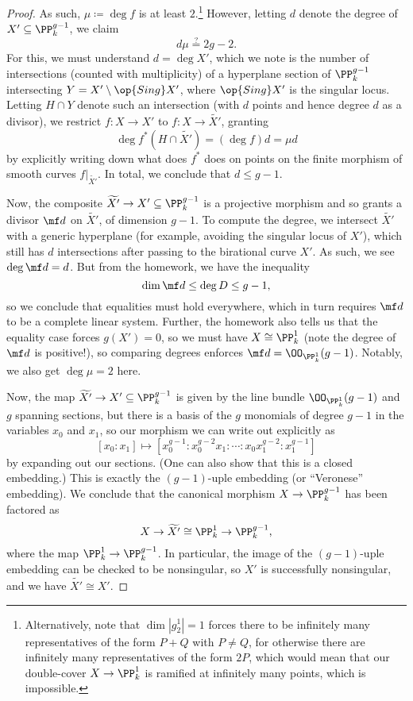 \documentclass[../notes.tex]{subfiles}
\begin{document}
\begin{proof}
	As such, $\mu\coloneqq\deg f$ is at least $2$.\footnote{Alternatively, note that $\dim|g^1_2|=1$ forces there to be infinitely many representatives of the form $P+Q$ with $P\ne Q$, for otherwise there are infinitely many representatives of the form $2P$, which would mean that our double-cover $X\to\PP^1_k$ is ramified at infinitely many points, which is impossible.} However, letting $d$ denote the degree of $X'\subseteq\PP^{g-1}_k$, we claim
	\[d\mu\stackrel?=2g-2.\]
	For this, we must understand $d=\deg X'$, which we note is the number of intersections (counted with multiplicity) of a hyperplane section of $\PP^{g-1}_k$ intersecting $Y=X'\setminus\op{Sing}X'$, where $\op{Sing}X'$ is the singular locus. Letting $H\cap Y$ denote such an intersection (with $d$ points and hence degree $d$ as a divisor), we restrict $f\colon X\to X'$ to $f\colon X\to\widetilde{X'}$, granting
	\[\deg f^*(H\cap \widetilde{X'})=(\deg f)d=\mu d\]
	by explicitly writing down what does $f^*$ does on points on the finite morphism of smooth curves $f|_{\widetilde{X'}}$. In total, we conclude that $d\le g-1$.

	Now, the composite $\widetilde{X'}\to X'\subseteq\PP^{g-1}_k$ is a projective morphism and so grants a divisor $\mf d$ on $\widetilde{X'}$, of dimension $g-1$. To compute the degree, we intersect $\widetilde{X'}$ with a generic hyperplane (for example, avoiding the singular locus of $X'$), which still has $d$ intersections after passing to the birational curve $X'$. As such, we see $\deg\mf d=d$. But from the homework, we have the inequality
	\[\dim\mf d\le\deg D\le g-1,\]
	so we conclude that equalities must hold everywhere, which in turn requires $\mf d$ to be a complete linear system. Further, the homework also tells us that the equality case forces $g(X')=0$, so we must have $X\cong\PP^1_k$ (note the degree of $\mf d$ is positive!), so comparing degrees enforces $\mf d=\OO_{\PP^1_k}(g-1)$. Notably, we also get $\deg\mu=2$ here.

	Now, the map $\widetilde{X'}\to X'\subseteq\PP^{g-1}_k$ is given by the line bundle $\OO_{\PP^1_k}(g-1)$ and $g$ spanning sections, but there is a basis of the $g$ monomials of degree $g-1$ in the variables $x_0$ and $x_1$, so our morphism we can write out explicitly as
	\[[x_0:x_1]\mapsto\left[x_0^{g-1}:x_0^{g-2}x_1:\cdots:x_0x_1^{g-2}:x_1^{g-1}\right]\]
	by expanding out our sections. (One can also show that this is a closed embedding.) This is exactly the $(g-1)$-uple embedding (or ``Veronese'' embedding). We conclude that the canonical morphism $X\to\PP^{g-1}_k$ has been factored as
	\[X\to\widetilde{X'}\cong\PP^1_k\to\PP^{g-1}_k,\]
	where the map $\PP^1_k\to\PP^{g-1}_k$. In particular, the image of the $(g-1)$-uple embedding can be checked to be nonsingular, so $X'$ is successfully nonsingular, and we have $\widetilde{X'}\cong X'$.


\end{proof}
\end{document}
